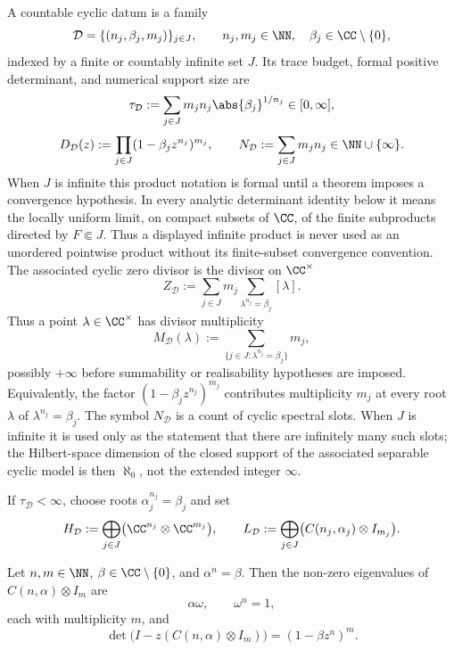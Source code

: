 \begin{definition}
  \label{def:cyclic-data-trace-budget}
  A countable cyclic datum is a family
  \[
    \mathcal D=\{(n_j,\beta_j,m_j)\}_{j\in J},
    \qquad
    n_j,m_j\in\NN,\quad \beta_j\in\CC\setminus\{0\},
  \]
  indexed by a finite or countably infinite set \(J\). Its trace budget,
  formal positive determinant, and numerical support size are
  \[
    \tau_{\mathcal D}
    :=\sum_{j\in J}m_j n_j\abs{\beta_j}^{1/n_j}\in[0,\infty],
  \]
  \[
    D_{\mathcal D}(z)
    :=\prod_{j\in J}(1-\beta_jz^{n_j})^{m_j},
    \qquad
    N_{\mathcal D}:=\sum_{j\in J}m_jn_j\in\NN\cup\{\infty\}.
  \]
  When \(J\) is infinite this product notation is formal until a theorem
  imposes a convergence hypothesis.  In every analytic determinant identity
  below it means the locally uniform limit, on compact subsets of \(\CC\), of
  the finite subproducts directed by \(F\Subset J\).  Thus a displayed
  infinite product is never used as an unordered pointwise product without its
  finite-subset convergence convention.
  The associated cyclic zero divisor is the divisor on
  \(\CC^\times\)
  \[
    Z_{\mathcal D}
    :=\sum_{j\in J}m_j\sum_{\lambda^{n_j}=\beta_j}[\lambda].
  \]
  Thus a point \(\lambda\in\CC^\times\) has divisor multiplicity
  \[
    M_{\mathcal D}(\lambda)
    :=\sum_{\{j\in J:\lambda^{n_j}=\beta_j\}}m_j,
  \]
  possibly \(+\infty\) before summability or realisability hypotheses are
  imposed. Equivalently, the factor
  \((1-\beta_jz^{n_j})^{m_j}\) contributes multiplicity \(m_j\) at every
  root \(\lambda\) of \(\lambda^{n_j}=\beta_j\).
  The symbol \(N_{\mathcal D}\) is a count of cyclic spectral slots. When
  \(J\) is infinite it is used only as the statement that there are
  infinitely many such slots; the Hilbert-space dimension of the closed
  support of the associated separable cyclic model is then \(\aleph_0\),
  not the extended integer \(\infty\).

  If \(\tau_{\mathcal D}<\infty\), choose roots
  \(\alpha_j^{n_j}=\beta_j\) and set
  \[
    H_{\mathcal D}
    :=\bigoplus_{j\in J}\bigl(\CC^{n_j}\otimes\CC^{m_j}\bigr),
    \qquad
    L_{\mathcal D}
    :=\bigoplus_{j\in J}\bigl(C(n_j,\alpha_j)\otimes I_{m_j}\bigr).
  \]
\end{definition}

\begin{lemma}
  \label{lem:single-cyclic-block-spectrum}
  Let \(n,m\in\NN\), \(\beta\in\CC\setminus\{0\}\), and
  \(\alpha^n=\beta\). Then the non-zero eigenvalues of
  \(C(n,\alpha)\otimes I_m\) are
  \[
    \alpha\omega,\qquad \omega^n=1,
  \]
  each with multiplicity \(m\), and
  \[
    \det\!\bigl(I-z(C(n,\alpha)\otimes I_m)\bigr)
    =(1-\beta z^n)^m .
  \]
\end{lemma}

